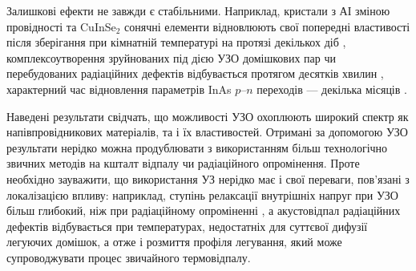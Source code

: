 %
%
%
%
%
%
%
%
%


Залишкові ефекти не завжди є стабільними.
Наприклад, кристали з АІ зміною провідності та  CuInSe$_2$ сонячні елементи відновлюють свої попередні властивості після зберігання при кімнатній температурі на протязі декількох діб \cite{YOlikh2006TPLr,US:ZnCdTe,BorkovFTT,OstapSC},
комплексоутворення зруйнованих під дією УЗО домішкових пар чи перебудованих радіаційних дефектів відбувається протягом десятків хвилин \cite{Ostapenko1995SST,Ostapenko1995,YOlikh2006TPLr},
характерний час відновлення параметрів InAs $p$--$n$ переходів --- декілька місяців \cite{Teterkin2009r}.



Наведені результати свідчать, що можливості УЗО охоплюють широкий спектр як напівпровідникових матеріалів, та і їх властивостей.
Отримані за допомогою УЗО результати нерідко можна продублювати з використанням більш технологічно звичних методів на кшталт відпалу чи радіаційного опромінення.
Проте необхідно зауважити, що використання УЗ нерідко має і свої переваги, пов'язані з локалізацією впливу:
наприклад, ступінь релаксації внутрішніх напруг при УЗО більш глибокий, ніж при радіаційному опроміненні \cite{UST:GeGaAs1990},
а акустовідпал радіаційних дефектів \cite{PodolHivr,UST:OstrovCsI,YOlikh2007TPLr} відбувається при температурах, недостатніх для суттєвої дифузії легуючих домішок, а отже і розмиття профіля легування, який може супроводжувати процес звичайного термовідпалу.

